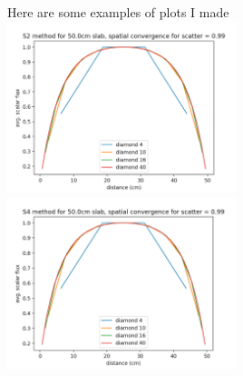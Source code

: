 \documentclass[a4paper]{article}
\begin{document}
Here are some examples of plots I made\\
\includegraphics[width=0.5\textwidth]{f8}
\includegraphics[width=0.5\textwidth]{f9}\\
\end{document}

